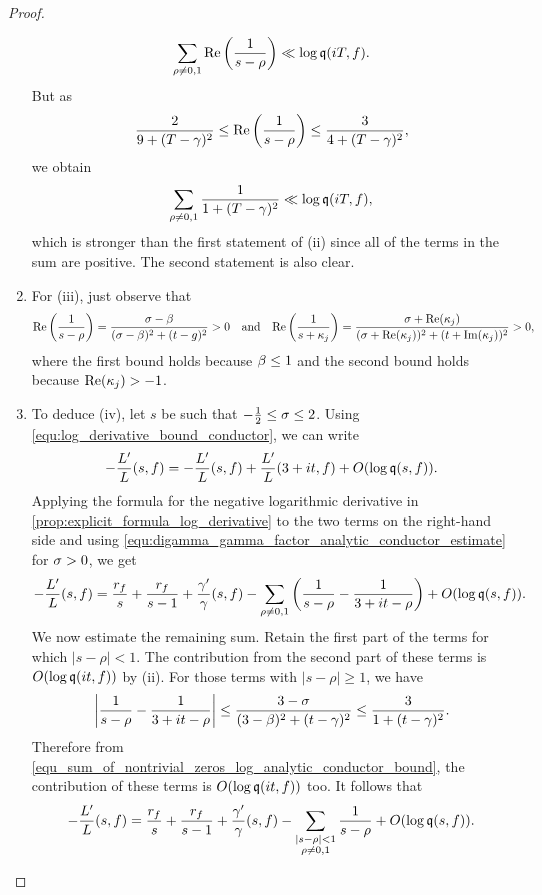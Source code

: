 \begin{proof}
\begin{enumerate}[label*=(\roman*)]
        \[
          \sum_{\rho \neq 0,1}\mathrm{Re}\left(\frac{1}{s-\rho}\right) \ll \log{\mathfrak{q}(iT,f)}.
        \]
        But as
        \[
          \frac{2}{9+(T-\gamma)^{2}} \le \mathrm{Re}\left(\frac{1}{s-\rho}\right) \le \frac{3}{4+(T-\gamma)^{2}},
        \]
        we obtain
        \begin{equation}\label{equ_sum_of_nontrivial_zeros_log_analytic_conductor_bound}
          \sum_{\rho \neq 0,1}\frac{1}{1+(T-\gamma)^{2}} \ll \log{\mathfrak{q}(iT,f)},
        \end{equation}
        which is stronger than the first statement of (ii) since all of the terms in the sum are positive. The second statement is also clear.
        \item For (iii), just observe that
        \[
          \mathrm{Re}\left(\frac{1}{s-\rho}\right) = \frac{\sigma-\beta}{(\sigma-\beta)^{2}+(t-
          g)^{2}} > 0 \quad \text{and} \quad \mathrm{Re}\left(\frac{1}{s+\kappa_{j}}\right) = \frac{\sigma+\mathrm{Re}(\kappa_{j})}{(\sigma+\mathrm{Re}(\kappa_{j}))^{2}+(t+\mathrm{Im}(\kappa_{j}))^{2}} > 0,
        \]
        where the first bound holds because $\beta \le 1$ and the second bound holds because $\mathrm{Re}(\kappa_{j}) > -1$.
        \item To deduce (iv), let $s$ be such that $-\frac{1}{2} \le \sigma \le 2$. Using \cref{equ:log_derivative_bound_conductor}, we can write
        \[
          -\frac{L'}{L}(s,f) = -\frac{L'}{L}(s,f)+\frac{L'}{L}(3+it,f)+O(\log{\mathfrak{q}(s,f)}).
        \]
        Applying the formula for the negative logarithmic derivative in \cref{prop:explicit_formula_log_derivative} to the two terms on the right-hand side and using \cref{equ:digamma_gamma_factor_analytic_conductor_estimate} for $\sigma > 0$, we get
        \[
          -\frac{L'}{L}(s,f) = \frac{r_{f}}{s}+\frac{r_{f}}{s-1}+\frac{\gamma'}{\gamma}(s,f)-\sum_{\rho \neq 0,1}\left(\frac{1}{s-\rho}-\frac{1}{3+it-\rho}\right)+O(\log{\mathfrak{q}(s,f)}).
        \]
        We now estimate the remaining sum. Retain the first part of the terms for which $|s-\rho| < 1$. The contribution from the second part of these terms is $O(\log{\mathfrak{q}(it,f)})$ by (ii). For those terms with $|s-\rho| \ge 1$, we have
        \[
          \left|\frac{1}{s-\rho}-\frac{1}{3+it-\rho}\right| \le \frac{3-\sigma}{(3-\beta)^{2}+(t-\gamma)^{2}} \le \frac{3}{1+(t-\gamma)^{2}}.
        \]
        Therefore from \cref{equ_sum_of_nontrivial_zeros_log_analytic_conductor_bound}, the contribution of these terms is $O(\log{\mathfrak{q}(it,f)})$ too. It follows that
        \[
          -\frac{L'}{L}(s,f) = \frac{r_{f}}{s}+\frac{r_{f}}{s-1}+\frac{\gamma'}{\gamma}(s,f)-\sum_{\substack{|s-\rho| < 1 \\ \rho \neq 0,1}}\frac{1}{s-\rho}+O(\log{\mathfrak{q}(s,f)}).
\]
\end{enumerate}
\end{proof}

